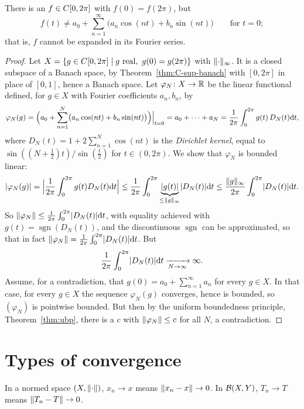 \begin{proposition}\label{prop:fourier-divergence}
There is an $f \in C[0,2\pi]$ with $f(0) = f(2\pi)$, but
\[
  f(t) \ne a_0 + \sum_{n=1}^{\infty} \bigl(a_n \cos(nt) + b_n \sin(nt)\bigr)
  \qquad \text{for } t = 0 ;
\]
that is, $f$ cannot be expanded in its Fourier series.
\end{proposition}

\begin{proof}
Let $X = \{g \in C[0,2\pi] \mid g \text{ real}, \ g(0) = g(2\pi)\}$
with $\lVert\cdot\rVert_\infty$. It is a closed subspace of a Banach space, by
Theorem~\ref{thm:C-sup-banach} with $[0,2\pi]$ in place of $[0,1]$, hence a
Banach space. Let $\varphi_N \colon X \to \mathbb{R}$ be the linear functional
defined, for $g \in X$ with Fourier coefficients $a_n, b_n$, by
\[
  \varphi_N(g) = \Bigl(a_0 + \sum_{n=1}^{N}
    \bigl(a_n \cos(nt) + b_n \sin(nt)\bigr)\Bigr)\Big|_{t=0}
  = a_0 + \dots + a_N
  = \frac{1}{2\pi}\int_0^{2\pi} g(t)\, D_N(t) \mathrm{d} t ,
\]
where $D_N(t) = 1 + 2\sum_{n=1}^{N} \cos(nt)$ is the \emph{Dirichlet
kernel}, equal to $\sin((N + \frac{1}{2})t) / \sin(\frac{t}{2})$ for
$t \in (0, 2\pi)$. We show that $\varphi_N$ is bounded linear:
\[
  \lvert\varphi_N(g)\rvert
  = \Bigl\lvert \frac{1}{2\pi}\int_0^{2\pi} g(t) D_N(t) \mathrm{d} t \Bigr\rvert
  \le \frac{1}{2\pi}\int_0^{2\pi} \underbrace{\lvert g(t)\rvert}_{\le
    \lVert g\rVert_\infty} \lvert D_N(t)\rvert \mathrm{d} t
  \le \frac{\lVert g\rVert_\infty}{2\pi}\int_0^{2\pi} \lvert D_N(t)\rvert \mathrm{d} t .
\]
So $\lVert\varphi_N\rVert \le \frac{1}{2\pi}\int_0^{2\pi} \lvert D_N(t)\rvert \mathrm{d} t$,
with equality achieved with $g(t) = \operatorname{sgn}(D_N(t))$, and the
discontinuous $\operatorname{sgn}$ can be approximated, so that in fact
$\lVert\varphi_N\rVert = \frac{1}{2\pi}\int_0^{2\pi} \lvert D_N(t)\rvert \mathrm{d} t$. But
\[
  \frac{1}{2\pi}\int_0^{2\pi} \lvert D_N(t)\rvert \mathrm{d} t
  \xrightarrow[N \to \infty]{} \infty .
\]
Assume, for a contradiction, that $g(0) = a_0 + \sum_{n=1}^{\infty} a_n$ for
every $g \in X$. In that case, for every $g \in X$ the sequence
$\varphi_N(g)$ converges, hence is bounded, so $(\varphi_N)$ is pointwise
bounded. But then by the uniform boundedness principle,
Theorem~\ref{thm:ubp}, there is a $c$ with $\lVert\varphi_N\rVert \le c$ for all
$N$, a contradiction.
\end{proof}

\section{Types of convergence}

In a normed space $(X, \lVert\cdot\rVert)$, $x_n \to x$ means
$\lVert x_n - x\rVert \to 0$. In $\mathcal{B}(X, Y)$, $T_n \to T$ means
$\lVert T_n - T\rVert \to 0$.

